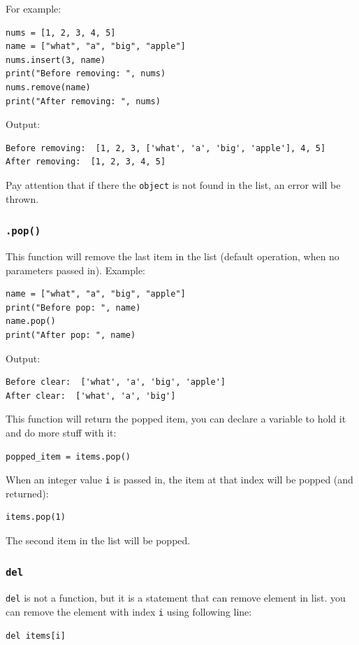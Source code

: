 \documentclass[12pt]{book}
\begin{document}
For example:
\begin{verbatim}
nums = [1, 2, 3, 4, 5]
name = ["what", "a", "big", "apple"]
nums.insert(3, name)
print("Before removing: ", nums)
nums.remove(name)
print("After removing: ", nums)
\end{verbatim}
Output:
\begin{verbatim}
Before removing:  [1, 2, 3, ['what', 'a', 'big', 'apple'], 4, 5]
After removing:  [1, 2, 3, 4, 5]
\end{verbatim}

Pay attention that if there the \texttt{object} is not found in the list, an error will be thrown.  
\subsubsection{\texttt{.pop()}}
\label{sec:org2ac61f5}
This function will remove the last item in the list (default operation, when no parameters passed in). Example:
\begin{verbatim}
name = ["what", "a", "big", "apple"]
print("Before pop: ", name)
name.pop()
print("After pop: ", name)
\end{verbatim}
Output:
\begin{verbatim}
Before clear:  ['what', 'a', 'big', 'apple']
After clear:  ['what', 'a', 'big']
\end{verbatim}

This function will return the popped item, you can declare a variable to hold it and do more stuff with it:
\begin{verbatim}
popped_item = items.pop()
\end{verbatim}

When an integer value \texttt{i} is passed in, the item at that index will be popped (and returned):
\begin{verbatim}
items.pop(1)
\end{verbatim}
The second item in the list will be popped.
\subsubsection{\texttt{del}}
\label{sec:orgb1685e8}
\texttt{del} is not a function, but it is a statement that can remove element in list. you can remove the element with index \texttt{i} using following line:
\begin{verbatim}
del items[i]
\end{verbatim}
\end{document}
